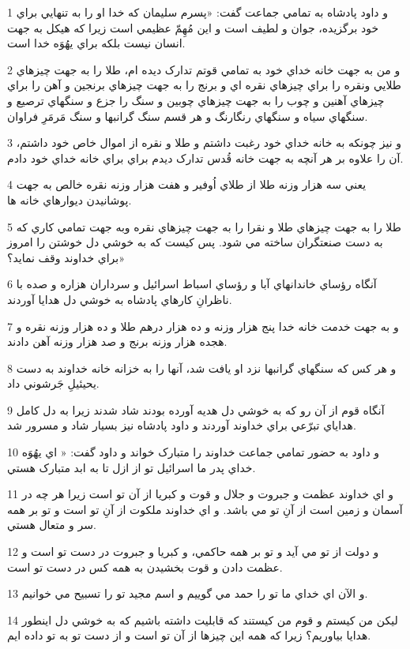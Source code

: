 \par 1 و داود پادشاه به تمامي جماعت گفت: «پسرم سليمان که خدا او را به تنهايي براي خود برگزيده، جوان و لطيف است و اين مُهِمّ عظيمي است زيرا که هيکل به جهت انسان نيست بلکه براي يهُوَه خدا است.
\par 2 و من به جهت خانه خداي خود به تمامي قوتم تدارک ديده ام، طلا را به جهت چيزهاي طلايي ونقره را براي چيزهاي نقره اي و برنج را به جهت چيزهاي برنجين و آهن را براي چيزهاي آهنين و چوب را به جهت چيزهاي چوبين و سنگ را جزع و سنگهاي ترصيع و سنگهاي سياه و سنگهاي رنگارنگ و هر قسم سنگ گرانبها و سنگ مَرمَرِ فراوان.
\par 3 و نيز چونکه به خانه خداي خود رغبت داشتم و طلا و نقره از اموال خاص خود داشتم، آن را علاوه بر هر آنچه به جهت خانه قُدس تدارک ديدم براي براي خانه خداي خود دادم.
\par 4 يعني سه هزار وزنه طلا از طلاي اُوفير و هفت هزار وزنه نقره خالص به جهت پوشانيدن ديوارهاي خانه ها.
\par 5 طلا را به جهت چيزهاي طلا و نقرا را به جهت چيزهاي نقره وبه جهت تمامي کاري که به دست صنعتگران ساخته مي شود. پس کيست که به خوشي دل خوشتن را امروز براي خداوند وقف نمايد؟»
\par 6 آنگاه رؤساي خاندانهاي آبا و رؤساي اسباط اسرائيل و سرداران هزاره و صده با ناظرانِ کارهاي پادشاه به خوشي دل هدايا آوردند.
\par 7 و به جهت خدمت خانه خدا پنج هزار وزنه و ده هزار درهم طلا و ده هزار وزنه نقره و هجده هزار وزنه برنج و صد هزار وزنه آهن دادند.
\par 8 و هر کس که سنگهاي گرانبها نزد او يافت شد، آنها را به خزانه خانه خداوند به دست يحيئيلِ جَرشوني داد.
\par 9 آنگاه قوم از آن رو که به خوشي دل هديه آورده بودند شاد شدند زيرا به دل کامل هداياي تبرّعي براي خداوند آوردند و داود پادشاه نيز بسيار شاد و مسرور شد.
\par 10 و داود به حضور تمامي جماعت خداوند را متبارک خواند و داود گفت: « اي يهُوَه خداي پدر ما اسرائيل تو از ازل تا به ابد متبارک هستي.
\par 11 و اي خداوند عظمت و جبروت و جلال و قوت و کبريا از آن تو است زيرا هر چه در آسمان و زمين است از آنِ تو مي باشد. و اي خداوند ملکوت از آنِ تو است و تو بر همه سر و متعال هستي.
\par 12 و دولت از تو مي آيد و تو بر همه حاکمي، و کبريا و جبروت در دست تو است و عظمت دادن و قوت بخشيدن به همه کس در دست تو است.
\par 13 و الآن اي خداي ما تو را حمد مي گوييم و اسم مجيد تو را تسبيح مي خوانيم.
\par 14 ليکن من کيستم و قوم من کيستند که قابليت داشته باشيم که به خوشي دل اينطور هدايا بياوريم؟ زيرا که همه اين چيزها از آن تو است و از دست تو به تو داده ايم.
